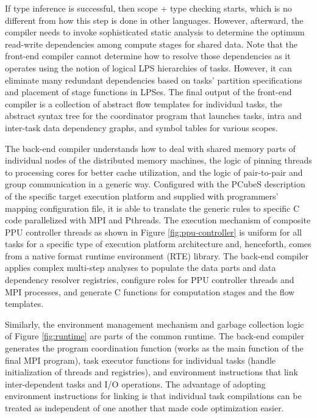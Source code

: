 \documentclass[ASNA,twocolumn]{USG} %
\begin{document}
{

If type inference is successful, then scope + type checking starts, which is no different from how this step is done in other languages. However, afterward, the compiler needs to invoke sophisticated static analysis to determine the optimum read-write dependencies among compute stages for shared data. Note that the front-end compiler cannot determine how to resolve those dependencies as it operates using the notion of logical LPS hierarchies of tasks. However, it can eliminate many redundant dependencies based on tasks' partition specifications and placement of stage functions in LPSes. The final output of the front-end compiler is a collection of abstract flow templates for individual tasks, the abstract syntax tree for the coordinator program that launches tasks, intra and inter-task data dependency graphs, and symbol tables for various scopes.     

The back-end compiler understands how to deal with shared memory parts of individual nodes of the distributed memory machines, the logic of pinning threads to processing cores for better cache utilization, and the logic of pair-to-pair and group communication in a generic way. Configured with the PCubeS description of the specific target execution platform and supplied with programmers' mapping configuration file, it is able to translate the generic rules to specific C code parallelized with MPI and Pthreads. The execution mechanism of composite PPU controller threads as shown in Figure \ref{fig:ppu-controller} is uniform for all tasks for a specific type of execution platform architecture and, henceforth, comes from a native format runtime environment (RTE) library. The back-end compiler applies complex multi-step analyses to populate the data parts and data dependency resolver registries, configure roles for PPU controller threads and MPI processes, and generate C functions for computation stages and the flow templates. 

Similarly, the environment management mechanism and garbage collection logic of Figure \ref{fig:runtime} are parts of the common runtime. The back-end compiler generates the program coordination function (works as the main function of the final MPI program), task executor functions for individual tasks (handle initialization of threads and registries), and environment instructions that link inter-dependent tasks and I/O operations. The advantage of adopting environment instructions for linking is that individual task compilations can be treated as independent of one another that made code optimization easier. 

}
\end{document}
